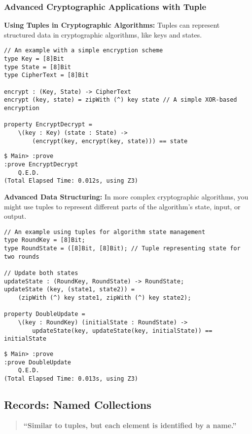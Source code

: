 \subsubsection{Advanced Cryptographic Applications with Tuple}
\textbf{Using Tuples in Cryptographic Algorithms:} Tuples can represent structured data in cryptographic algorithms, like keys and states.
\begin{lstlisting}[style=cryptol]
// An example with a simple encryption scheme
type Key = [8]Bit
type State = [8]Bit
type CipherText = [8]Bit

encrypt : (Key, State) -> CipherText
encrypt (key, state) = zipWith (^) key state // A simple XOR-based encryption

property EncryptDecrypt = 
	\(key : Key) (state : State) ->
		(encrypt(key, encrypt(key, state))) == state
\end{lstlisting}
\begin{lstlisting}[style=zsh]
$ Main> :prove 
:prove EncryptDecrypt
	Q.E.D.
(Total Elapsed Time: 0.012s, using Z3)
\end{lstlisting}
\vspace{16pt}
\textbf{Advanced Data Structuring:} In more complex cryptographic algorithms, you might use tuples to represent different parts of the algorithm's state, input, or output.
\begin{lstlisting}[style=cryptol]
// An example using tuples for algorithm state management
type RoundKey = [8]Bit;
type RoundState = ([8]Bit, [8]Bit); // Tuple representing state for two rounds

// Update both states
updateState : (RoundKey, RoundState) -> RoundState;
updateState (key, (state1, state2)) =
	(zipWith (^) key state1, zipWith (^) key state2);

property DoubleUpdate = 
	\(key : RoundKey) (initialState : RoundState) ->
		updateState(key, updateState(key, initialState)) == initialState
\end{lstlisting}
\begin{lstlisting}[style=zsh]
$ Main> :prove 
:prove DoubleUpdate
	Q.E.D.
(Total Elapsed Time: 0.013s, using Z3)
\end{lstlisting}

\newpage
\subsection{Records: Named Collections}
\begin{quote}\bf
``Similar to tuples, but each element is identified by a name.''
\end{quote}

